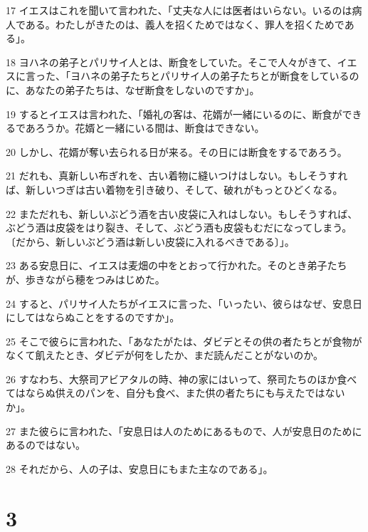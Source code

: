 \par 17 イエスはこれを聞いて言われた、「丈夫な人には医者はいらない。いるのは病人である。わたしがきたのは、義人を招くためではなく、罪人を招くためである」。
\par 18 ヨハネの弟子とパリサイ人とは、断食をしていた。そこで人々がきて、イエスに言った、「ヨハネの弟子たちとパリサイ人の弟子たちとが断食をしているのに、あなたの弟子たちは、なぜ断食をしないのですか」。
\par 19 するとイエスは言われた、「婚礼の客は、花婿が一緒にいるのに、断食ができるであろうか。花婿と一緒にいる間は、断食はできない。
\par 20 しかし、花婿が奪い去られる日が来る。その日には断食をするであろう。
\par 21 だれも、真新しい布ぎれを、古い着物に縫いつけはしない。もしそうすれば、新しいつぎは古い着物を引き破り、そして、破れがもっとひどくなる。
\par 22 まただれも、新しいぶどう酒を古い皮袋に入れはしない。もしそうすれば、ぶどう酒は皮袋をはり裂き、そして、ぶどう酒も皮袋もむだになってしまう。〔だから、新しいぶどう酒は新しい皮袋に入れるべきである〕」。
\par 23 ある安息日に、イエスは麦畑の中をとおって行かれた。そのとき弟子たちが、歩きながら穂をつみはじめた。
\par 24 すると、パリサイ人たちがイエスに言った、「いったい、彼らはなぜ、安息日にしてはならぬことをするのですか」。
\par 25 そこで彼らに言われた、「あなたがたは、ダビデとその供の者たちとが食物がなくて飢えたとき、ダビデが何をしたか、まだ読んだことがないのか。
\par 26 すなわち、大祭司アビアタルの時、神の家にはいって、祭司たちのほか食べてはならぬ供えのパンを、自分も食べ、また供の者たちにも与えたではないか」。
\par 27 また彼らに言われた、「安息日は人のためにあるもので、人が安息日のためにあるのではない。
\par 28 それだから、人の子は、安息日にもまた主なのである」。

\chapter{3}

